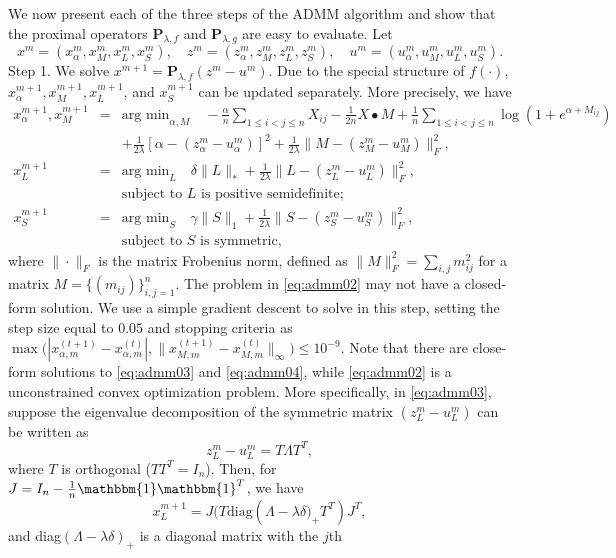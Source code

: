 \documentclass[AMS,STIX1COL]{WileyNJD-v2}
\begin{document}
{We now present each of the three steps of the ADMM algorithm and show that the proximal
operators $\mathbf{P}_{\lambda,f}$ and $\mathbf{P}_{\lambda,g}$ are easy to evaluate.
Let
$$
x^m = (x^m_\alpha, x^m_M, x^m_L, x^m_S), \quad
z^m = (z^m_\alpha, z^m_M, z^m_L, z^m_S), \quad
u^m = (u^m_\alpha, u^m_M, u^m_L, u^m_S).
$$
Step 1. We solve $x^{m+1} = \mathbf{P}_{\lambda,f}(z^m - u^m)$.
Due to the special structure of $f(\cdot)$,
$x^{m+1}_\alpha, x^{m+1}_M, x^{m+1}_L$, and $x^{m+1}_S$
can be updated separately.
More precisely, we have
\begin{eqnarray}
x^{m+1}_\alpha, x^{m+1}_M &=& \mbox{arg min}_{\alpha, M} \quad
-\frac{\alpha}{n} \sum_{1\le i< j\le n}X_{ij}
-\frac{1}{2n} X \bullet M
+ \frac{1}{n} \sum_{1\le i<j\le n} \log \left(1 + e^{\alpha + M_{ij}}\right) \nonumber \\
&& + \frac{1}{2\lambda}\left[\alpha - (z^m_\alpha - u^m_\alpha)\right]^2
+ \frac{1}{2\lambda}\|M - (z^m_M - u^m_M)\|^2_F, \label{eq:admm02} \\
x^{m+1}_L &=& \mbox{arg min}_{ L} \quad \delta \|L\|_\ast
+ \frac{1}{2\lambda}\|L - (z^m_L - u^m_L)\|^2_F,\label{eq:admm03}
\\
&& \mbox{subject to $L$ is positive semidefinite;} \nonumber \\
x^{m+1}_S &=& \mbox{arg min}_{ S} \quad  \gamma \|S\|_1
+ \frac{1}{2\lambda}\|S - (z^m_S - u^m_S)\|^2_F,
\label{eq:admm04}
\\
&& \mbox{subject to $S$ is symmetric,} \nonumber
\end{eqnarray}
where $\|\cdot\|_F$ is the matrix Frobenius norm, defined as
$\|M\|^2_F = \sum_{i,j} m^2_{ij}$ for a matrix $M = \{(m_{ij})\}_{i,j=1}^{n}$.
The problem in \eqref{eq:admm02} may not have a closed-form solution.
We use a simple gradient descent to solve in this step, setting the step size equal to $0.05$ and stopping criteria as $\max\big(|x_{\alpha,m}^{(t+1)}-x_{\alpha,m}^{(t)}|,\|x_{M,m}^{(t+1)}-x_{M,m}^{(t)}\|_{\infty}\big) \leq 10^{-9}$.
Note that there are close-form solutions to \eqref{eq:admm03} and \eqref{eq:admm04}, while \eqref{eq:admm02} is a unconstrained convex optimization problem.
More specifically, in \eqref{eq:admm03}, suppose the eigenvalue decomposition of the symmetric matrix $(z^m_L - u^m_L)$ can be written as
$$
z^m_L - u^m_L = T \Lambda T^T,
$$
where $T$ is orthogonal ($T T^T = I_n$). Then, for $J=I_{n}-\frac{1}{n}\mathbbm{1}\mathbbm{1}^T$, we have
$$
x^{m+1}_L = J \big(T \mbox{diag}(\Lambda-\lambda \delta\big)_+ T^T)J^{T},
$$
and diag$(\Lambda-\lambda \delta)_+$ is a diagonal matrix with the $j$th
}
\end{document}

